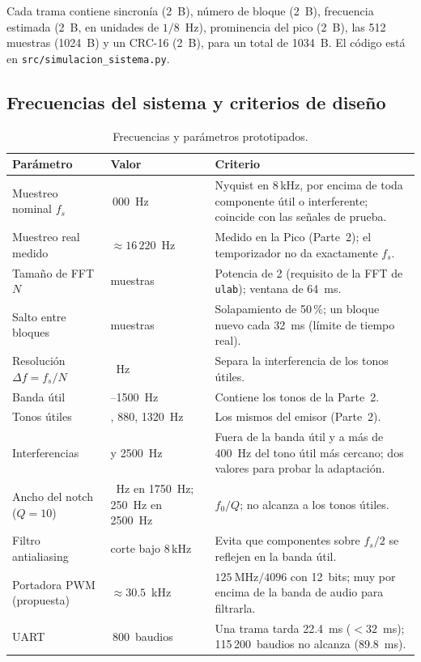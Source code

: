 \documentclass[11pt,a4paper]{article}
\begin{document}
Cada trama contiene sincronía (2~B), número de bloque (2~B), frecuencia
estimada (2~B, en unidades de $1/8$~Hz), prominencia del pico (2~B), las
512 muestras (1024~B) y un CRC-16 (2~B), para un total de 1034~B. El código
está en \texttt{src/simulacion\_sistema.py}.
 
\subsection{Frecuencias del sistema y criterios de diseño}
 
\begin{table}[h]
  \centering
  \small
  \begin{tabular}{>{\raggedright\arraybackslash}p{3.8cm}>{\raggedright\arraybackslash}p{3.4cm}>{\raggedright\arraybackslash}p{7.4cm}}
    \toprule
    Parámetro & Valor & Criterio \\
    \midrule
    Muestreo nominal $f_s$ & 16\,000~Hz & Nyquist en 8\,kHz, por encima de toda
      componente útil o interferente; coincide con las señales de prueba. \\
    Muestreo real medido & $\approx 16\,220$~Hz & Medido en la Pico (Parte~2);
      el temporizador no da exactamente $f_s$. \\
    Tamaño de FFT $N$ & 1024 muestras & Potencia de 2 (requisito de la FFT de
      \texttt{ulab}); ventana de 64~ms. \\
    Salto entre bloques & 512 muestras & Solapamiento de 50\,\%; un bloque nuevo
      cada 32~ms (límite de tiempo real). \\
    Resolución $\Delta f = f_s/N$ & 15.6~Hz & Separa la interferencia de los
      tonos útiles. \\
    Banda útil & 300--1500~Hz & Contiene los tonos de la Parte~2. \\
    Tonos útiles & 440, 880, 1320~Hz & Los mismos del emisor (Parte~2). \\
    Interferencias & 1750 y 2500~Hz & Fuera de la banda útil y a más de
      400~Hz del tono útil más cercano; dos valores para probar la
      adaptación. \\
    Ancho del notch ($Q=10$) & 175~Hz en 1750~Hz; 250~Hz en 2500~Hz & $f_0/Q$; no
      alcanza a los tonos útiles. \\
    Filtro antialiasing & corte bajo 8\,kHz & Evita que componentes sobre
      $f_s/2$ se reflejen en la banda útil. \\
    Portadora PWM (propuesta) & $\approx 30.5$~kHz & $125~\text{MHz}/4096$ con
      12~bits; muy por encima de la banda de audio para filtrarla. \\
    UART & 460\,800~baudios & Una trama tarda 22.4~ms ($< 32$~ms);
      115\,200~baudios no alcanza (89.8~ms). \\
    \bottomrule
  \end{tabular}
  \caption{Frecuencias y parámetros prototipados.}
  \label{tab:frecuencias}
\end{table}
 
\end{document}
